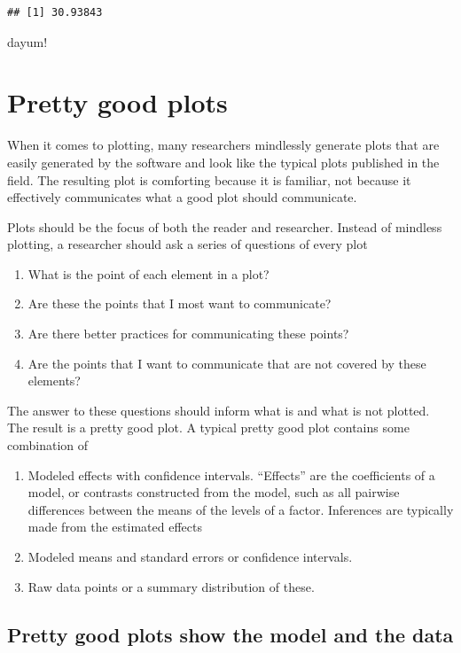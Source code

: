 \documentclass[]{book}
\providecommand{\tightlist}{%
  \setlength{\itemsep}{0pt}\setlength{\parskip}{0pt}}
\begin{document}
\begin{verbatim}
## [1] 30.93843
\end{verbatim}

dayum!

\chapter{Pretty good plots}\label{pretty-good-plots}

When it comes to plotting, many researchers mindlessly generate plots
that are easily generated by the software and look like the typical
plots published in the field. The resulting plot is comforting because
it is familiar, not because it effectively communicates what a good plot
should communicate.

Plots should be the focus of both the reader and researcher. Instead of
mindless plotting, a researcher should ask a series of questions of
every plot

\begin{enumerate}
\def\labelenumi{\arabic{enumi}.}
\tightlist
\item
  What is the point of each element in a plot?
\item
  Are these the points that I most want to communicate?
\item
  Are there better practices for communicating these points?
\item
  Are the points that I want to communicate that are not covered by
  these elements?
\end{enumerate}

The answer to these questions should inform what is and what is not
plotted. The result is a pretty good plot. A typical pretty good plot
contains some combination of

\begin{enumerate}
\def\labelenumi{\arabic{enumi}.}
\tightlist
\item
  Modeled effects with confidence intervals. ``Effects'' are the
  coefficients of a model, or contrasts constructed from the model, such
  as all pairwise differences between the means of the levels of a
  factor. Inferences are typically made from the estimated effects
\item
  Modeled means and standard errors or confidence intervals.
\item
  Raw data points or a summary distribution of these.
\end{enumerate}

\section{Pretty good plots show the model and the
data}\label{pretty-good-plots-show-the-model-and-the-data}
\end{document}
